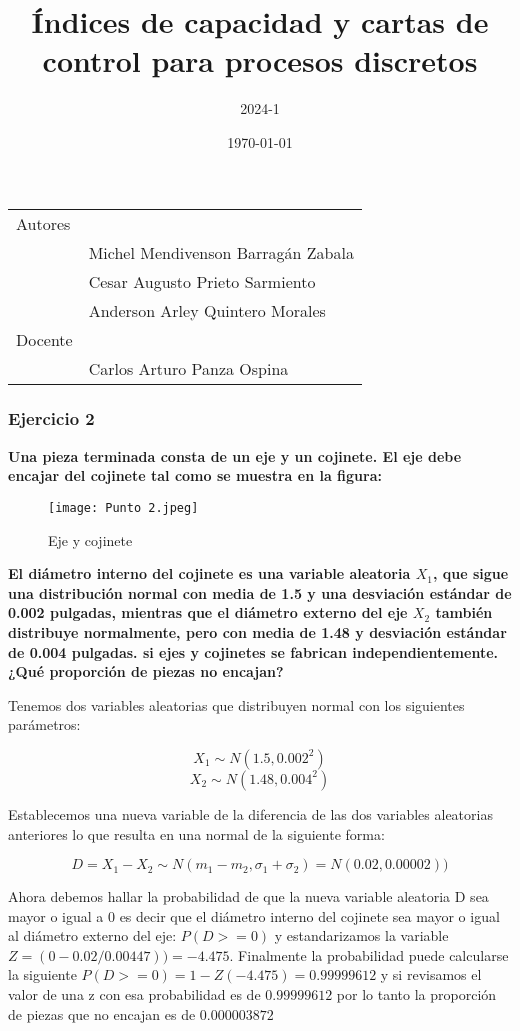 \documentclass{article}
\title{Índices de capacidad y cartas de control para procesos discretos}
\author{2024-1}
\date{\today}
\begin{document}
\maketitle

\noindent\begin{tabular}{@{}ll}
    Autores & \\
    & Michel Mendivenson Barragán Zabala \\
    & Cesar Augusto Prieto Sarmiento \\
    & Anderson Arley Quintero Morales \\
     Docente & \\
     & Carlos Arturo Panza Ospina
\end{tabular}

\subsubsection*{Ejercicio 2} \textbf{Una pieza terminada consta de un eje y un cojinete. El eje debe encajar del cojinete tal como se muestra en la figura:}

\begin{figure}[h]
    \centering
    \texttt{[image: Punto 2.jpeg]}
    \caption{Eje y cojinete}
    \label{fig:enter-label}
\end{figure}

\textbf{El diámetro interno del cojinete es una variable aleatoria $X_1$, que sigue una distribución normal con media de 1.5 y una desviación estándar de 0.002 pulgadas, mientras que el diámetro externo del eje $X_2$ también distribuye normalmente, pero con media de 1.48 y desviación estándar de 0.004 pulgadas. si ejes y cojinetes se fabrican independientemente. ¿Qué proporción de piezas no encajan?}

\vspace{0.5cm}

Tenemos dos variables aleatorias que distribuyen normal con los siguientes parámetros:

$$X_1 \sim N(1.5,0.002^2)$$
$$X_2 \sim N(1.48,0.004^2)$$

Establecemos una nueva variable de la diferencia de las dos variables aleatorias anteriores lo que resulta en una normal de la siguiente forma:

$$D=X_1 - X_2 \sim N(m_1 - m_2,\sigma_1+\sigma_2) = N(0.02,0.00002))$$ 

Ahora debemos hallar la probabilidad de que la nueva variable aleatoria D sea mayor o igual a 0 es decir que el diámetro interno del cojinete sea mayor o igual al diámetro externo del eje: $P(D>=0)$ y estandarizamos la variable $Z=(0-0.02/0.00447))=-4.475$. Finalmente la probabilidad puede calcularse la siguiente $P(D>=0)= 1 - Z(-4.475)=0.99999612$  y si revisamos el valor de una z con esa probabilidad es de $0.99999612$ por lo tanto la proporción de piezas que no encajan es de $0.000003872$
\end{document}
